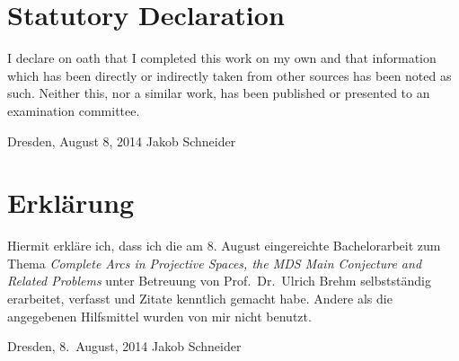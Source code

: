 \pagestyle{empty}
\section*{Statutory Declaration}

I declare on oath that I completed this work on my own and that information which has been directly or indirectly taken from other sources has been noted as such. Neither this, nor a similar work, has been published or presented to an examination committee.

\bigskip \bigskip \bigskip \bigskip \bigskip
\noindent Dresden, August 8, 2014 \hfill Jakob Schneider

\section*{Erkl\"{a}rung}
\thispagestyle{empty}
Hiermit erkl\"{a}re ich, dass ich die am 8. August eingereichte Bachelorarbeit zum Thema
\emph{Complete Arcs in Projective Spaces, the MDS Main Conjecture and Related Problems} unter Betreuung von Prof.~Dr.~Ulrich Brehm selbstst\"{a}ndig erarbeitet, 
verfasst und Zitate kenntlich gemacht habe. Andere als die angegebenen Hilfsmittel 
wurden von mir nicht benutzt.

\bigskip \bigskip \bigskip \bigskip \bigskip
\noindent Dresden, 8.~August, 2014 \hfill Jakob Schneider
\cleardoublepage%
